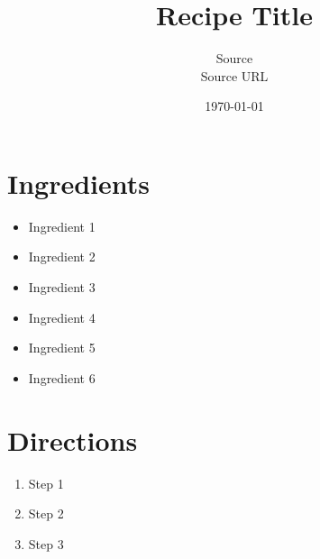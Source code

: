 \documentclass[11pt,letterpaper]{article}
\title{Recipe Title}
\author{Source \\ \small{ Source URL }}
\date{\today}
\begin{document}
\maketitle

\section*{Ingredients}
\begin{multicols}{2}
    \begin{itemize}
        \item Ingredient 1
        \item Ingredient 2
        \item Ingredient 3
    \end{itemize}
    \columnbreak
    \begin{itemize}
        \item Ingredient 4
        \item Ingredient 5
        \item Ingredient 6
    \end{itemize}
\end{multicols}

\section*{Directions}
\begin{enumerate}
    \item Step 1
    \item Step 2
    \item Step 3
\end{enumerate}
\end{document}

